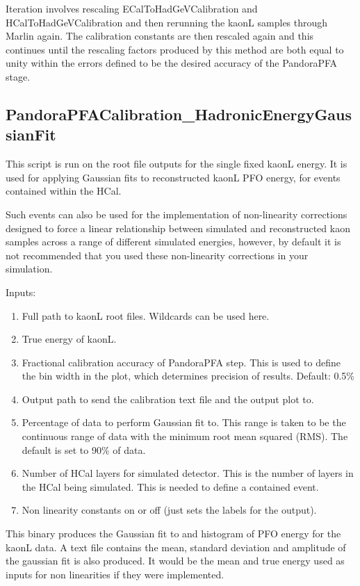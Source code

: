 \documentclass[11pt, oneside]{article}   	%
\begin{document}
Iteration involves rescaling ECalToHadGeVCalibration and HCalToHadGeVCalibration and then rerunning the kaonL samples through Marlin again.  The calibration constants are then rescaled again and this continues until the rescaling factors produced by this method are both equal to unity within the errors defined to be the desired accuracy of the PandoraPFA stage.

\subsection{PandoraPFACalibration\_HadronicEnergyGaussianFit}

This script is run on the root file outputs for the single fixed kaonL energy.  It is used for applying Gaussian fits to reconstructed kaonL PFO energy, for events contained within the HCal.

Such events can also be used for the implementation of non-linearity corrections designed to force a linear relationship between simulated and reconstructed kaon samples across a range of different simulated energies, however, by default it is not recommended that you used these non-linearity corrections in your simulation.

Inputs:
\begin{enumerate}
\item Full path to kaonL root files.  Wildcards can be used here.
\item True energy of kaonL.
\item Fractional calibration accuracy of PandoraPFA step.  This is used to define the bin width in the plot, which determines precision of results.  Default: 0.5\%
\item Output path to send the calibration text file and the output plot to.
\item Percentage of data to perform Gaussian fit to.  This range is taken to be the continuous range of data with the minimum root mean squared (RMS).  The default is set to 90\% of data.
\item Number of HCal layers for simulated detector.  This is the number of layers in the HCal being simulated.  This is needed to define a contained event.
\item Non linearity constants on or off (just sets the labels for the output).
\end{enumerate}

This binary produces the Gaussian fit to and histogram of PFO energy for the kaonL data.  A text file contains the mean, standard deviation and amplitude of the gaussian fit is also produced.  It would be the mean and true energy used as inputs for non linearities if they were implemented.
\end{document}
